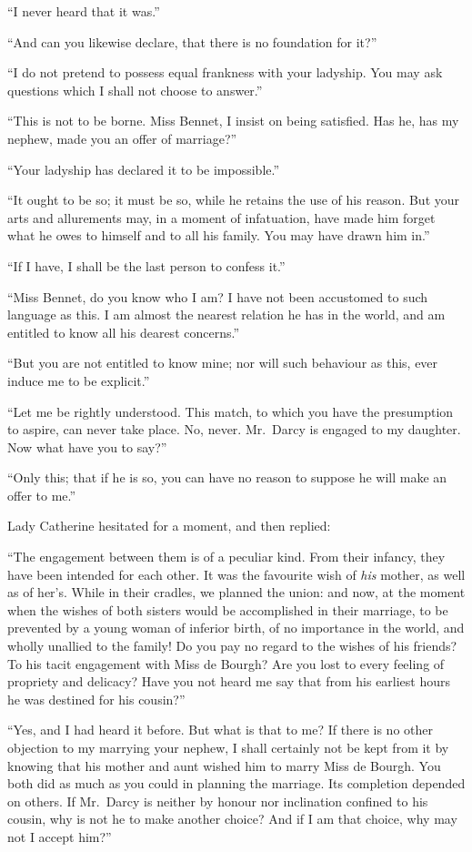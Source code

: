 \documentclass[12pt,english,oneside]{book}
\begin{document}
{}``I never heard that it was.''

{}``And can you likewise declare, that there is no foundation for
it?''\ 

{}``I do not pretend to possess equal frankness with your ladyship.
You may ask questions which I shall not choose to answer.''

{}``This is not to be borne. Miss Bennet, I insist on being satisfied.
Has he, has my nephew, made you an offer of marriage?''\ 

{}``Your ladyship has declared it to be impossible.''

{}``It ought to be so; it must be so, while he retains the use of
his reason. But your arts and allurements may, in a moment of infatuation,
have made him forget what he owes to himself and to all his family.
You may have drawn him in.''

{}``If I have, I shall be the last person to confess it.''

{}``Miss Bennet, do you know who I am? I have not been accustomed
to such language as this. I am almost the nearest relation he has
in the world, and am entitled to know all his dearest concerns.''

{}``But you are not entitled to know mine; nor will such behaviour
as this, ever induce me to be explicit.''

{}``Let me be rightly understood. This match, to which you have the
presumption to aspire, can never take place. No, never. Mr.\ Darcy
is engaged to my daughter. Now what have you to say?''\ 

{}``Only this; that if he is so, you can have no reason to suppose
he will make an offer to me.''

Lady Catherine hesitated for a moment, and then replied:

{}``The engagement between them is of a peculiar kind. From their
infancy, they have been intended for each other. It was the favourite
wish of \textit{his} mother, as well as of her's. While in their cradles,
we planned the union: and now, at the moment when the wishes of both
sisters would be accomplished in their marriage, to be prevented by
a young woman of inferior birth, of no importance in the world, and
wholly unallied to the family! Do you pay no regard to the wishes
of his friends? To his tacit engagement with Miss de Bourgh? Are you
lost to every feeling of propriety and delicacy? Have you not heard
me say that from his earliest hours he was destined for his cousin?''\ 

{}``Yes, and I had heard it before. But what is that to me? If there
is no other objection to my marrying your nephew, I shall certainly
not be kept from it by knowing that his mother and aunt wished him
to marry Miss de Bourgh. You both did as much as you could in planning
the marriage. Its completion depended on others. If Mr.\ Darcy is
neither by honour nor inclination confined to his cousin, why is not
he to make another choice? And if I am that choice, why may not I
accept him?''\ 
\end{document}
